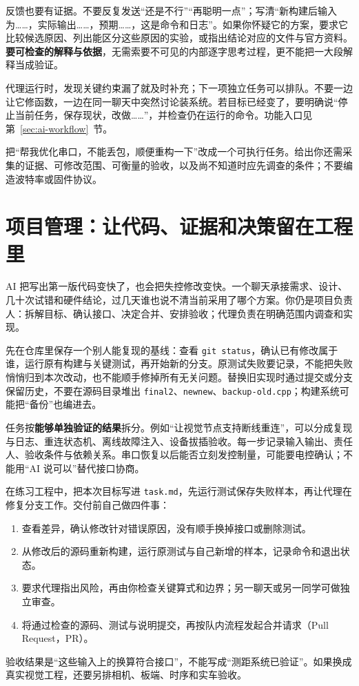 反馈也要有证据。不要反复发送“还是不行”“再聪明一点”；写清“新构建后输入为……，实际输出……，预期……，这是命令和日志”。如果你怀疑它的方案，要求它比较候选原因、列出能区分这些原因的实验，或指出结论对应的文件与官方资料。\textbf{要可检查的解释与依据}，无需索要不可见的内部逐字思考过程，更不能把一大段解释当成验证。

代理运行时，发现关键约束漏了就及时补充；下一项独立任务可以排队。不要一边让它修函数，一边在同一聊天中突然讨论装系统。若目标已经变了，要明确说“停止当前任务，保存现状，改做……”，并检查仍在运行的命令。功能入口见第~\ref{sec:ai-workflow}~节。

\begin{exercise}\label{ex:ai-prompt}
把“帮我优化串口，不能丢包，顺便重构一下”改成一个可执行任务。给出你还需采集的证据、可修改范围、可衡量的验收，以及尚不知道时应先调查的条件；不要编造波特率或固件协议。
\end{exercise}

\section{项目管理：让代码、证据和决策留在工程里}
\label{sec:ai-project-management}

AI 把写出第一版代码变快了，也会把失控修改变快。一个聊天承接需求、设计、几十次试错和硬件结论，过几天谁也说不清当前采用了哪个方案。你仍是项目负责人：拆解目标、确认接口、决定合并、安排验收；代理负责在明确范围内调查和实现。

先在仓库里保存一个别人能复现的基线：查看 \texttt{git status}，确认已有修改属于谁，运行原有构建与关键测试，再开始新的分支。原测试失败要记录，不能把失败悄悄归到本次改动，也不能顺手修掉所有无关问题。替换旧实现时通过提交或分支保留历史，不要在源码目录堆出 \texttt{final2}、\texttt{newnew}、\texttt{backup-old.cpp}；构建系统可能把“备份”也编进去。

任务按\textbf{能够单独验证的结果}拆分。例如“让视觉节点支持断线重连”，可以分成复现与日志、重连状态机、离线故障注入、设备拔插验收。每一步记录输入输出、责任人、验收条件与依赖关系。串口恢复以后能否立刻发控制量，可能要电控确认；不能用“AI 说可以”替代接口协商。

\begin{example}[给一个小任务安排完整闭环]
在练习工程中，把本次目标写进 \texttt{task.md}，先运行测试保存失败样本，再让代理在修复分支工作。交付前自己做四件事：
\begin{enumerate}
  \item 查看差异，确认修改针对错误原因，没有顺手换掉接口或删除测试。
  \item 从修改后的源码重新构建，运行原测试与自己新增的样本，记录命令和退出状态。
  \item 要求代理指出风险，再由你检查关键算式和边界；另一聊天或另一同学可做独立审查。
  \item 将通过检查的源码、测试与说明提交，再按队内流程发起合并请求（Pull Request，PR）。
\end{enumerate}
验收结果是“这些输入上的换算符合接口”，不能写成“测距系统已验证”。如果换成真实视觉工程，还要另排相机、板端、时序和实车验收。
\end{example}

